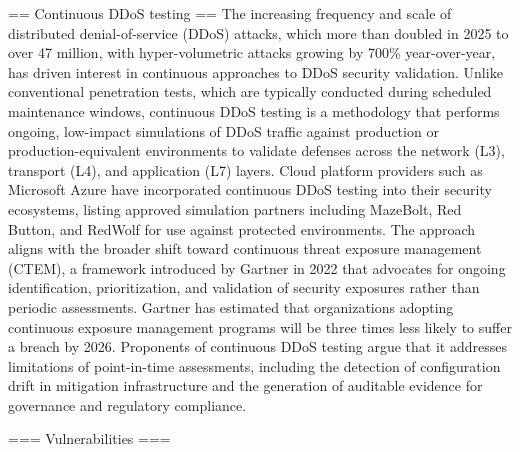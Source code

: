 == Continuous DDoS testing ==
The increasing frequency and scale of distributed denial-of-service (DDoS) attacks, which more than doubled in 2025 to over 47 million, with hyper-volumetric attacks growing by 700\% year-over-year, has driven interest in continuous approaches to DDoS security validation. 
Unlike conventional penetration tests, which are typically conducted during scheduled maintenance windows, continuous DDoS testing is a methodology that performs ongoing, low-impact simulations of DDoS traffic against production or production-equivalent environments to validate defenses across the network (L3), transport (L4), and application (L7) layers. Cloud platform providers such as Microsoft Azure have incorporated continuous DDoS testing into their security ecosystems, listing approved simulation partners including MazeBolt, Red Button, and RedWolf for use against protected environments.
The approach aligns with the broader shift toward continuous threat exposure management (CTEM), a framework introduced by Gartner in 2022 that advocates for ongoing identification, prioritization, and validation of security exposures rather than periodic assessments. Gartner has estimated that organizations adopting continuous exposure management programs will be three times less likely to suffer a breach by 2026. Proponents of continuous DDoS testing argue that it addresses limitations of point-in-time assessments, including the detection of configuration drift in mitigation infrastructure and the generation of auditable evidence for governance and regulatory compliance.


=== Vulnerabilities ===

